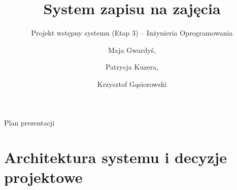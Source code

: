 \documentclass[aspectratio=169, 10pt, xcolor=table]{beamer}
\title[System zapisu na zajęcia]{System zapisu na zajęcia}
\subtitle{Projekt wstępny systemu (Etap 3) -- Inżynieria Oprogramowania}
\author[]{Maja Gwardyś, \and Patrycja Kuzera, \and Krzysztof Gąsiorowski}
\institute[]{}
\date[]{}
\begin{document}
\begin{frame}
    \titlepage
\end{frame}

\begin{frame}{Plan prezentacji}
    \footnotesize
    \tableofcontents
\end{frame}

\section{Architektura systemu i decyzje projektowe}
\end{document}
